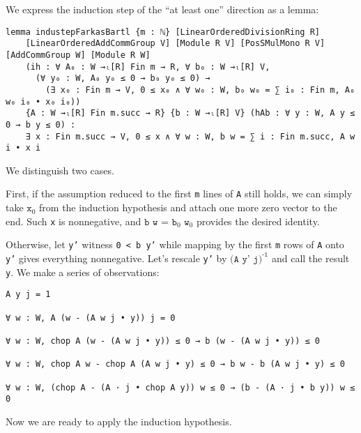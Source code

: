 \documentclass[]{article}
\begin{document}
We express the induction step of the ``at least one'' direction as a lemma:
\begin{lstlisting}
lemma industepFarkasBartl {m : ℕ} [LinearOrderedDivisionRing R]
    [LinearOrderedAddCommGroup V] [Module R V] [PosSMulMono R V] [AddCommGroup W] [Module R W]
    (ih : ∀ A₀ : W →ₗ[R] Fin m → R, ∀ b₀ : W →ₗ[R] V,
      (∀ y₀ : W, A₀ y₀ ≤ 0 → b₀ y₀ ≤ 0) →
        (∃ x₀ : Fin m → V, 0 ≤ x₀ ∧ ∀ w₀ : W, b₀ w₀ = ∑ i₀ : Fin m, A₀ w₀ i₀ • x₀ i₀))
    {A : W →ₗ[R] Fin m.succ → R} {b : W →ₗ[R] V} (hAb : ∀ y : W, A y ≤ 0 → b y ≤ 0) :
    ∃ x : Fin m.succ → V, 0 ≤ x ∧ ∀ w : W, b w = ∑ i : Fin m.succ, A w i • x i
\end{lstlisting}
We distinguish two cases.

First, if the assumption reduced to the first \texttt{m} lines of \texttt{A} still holds,
we can simply take $\texttt{x}_0$ from the induction hypothesis and attach one more zero vector
to the end. Such \texttt{x} is nonnegative, and $\texttt{b w = b}_0\texttt{ w}_0$ provides
the desired identity.

Otherwise, let \texttt{y'} witness \texttt{0 < b y'} while mapping by the first \texttt{m} rows
of \texttt{A} onto \texttt{y'} gives everything nonnegative.
Let's rescale \texttt{y'} by $\texttt{(A y' j)}^{\texttt{-1}}$ and call the result \texttt{y}.
We make a series of observations:
\begin{lstlisting}
A y j = 1

∀ w : W, A (w - (A w j • y)) j = 0

∀ w : W, chop A (w - (A w j • y)) ≤ 0 → b (w - (A w j • y)) ≤ 0

∀ w : W, chop A w - chop A (A w j • y) ≤ 0 → b w - b (A w j • y) ≤ 0

∀ w : W, (chop A - (A · j • chop A y)) w ≤ 0 → (b - (A · j • b y)) w ≤ 0
\end{lstlisting}
Now we are ready to apply the induction hypothesis.
	
\end{document}
